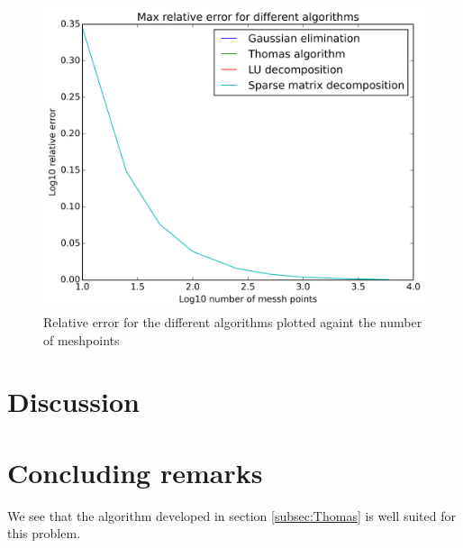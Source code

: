\documentclass[11pt,a4paper,english,draft]{article}
\numberwithin{equation}{section}
\begin{document}
\begin{figure}[ht!]
\centering
  \includegraphics[scale=0.5]{Results/n_err.png}
  \caption{Relative error for the different algorithms plotted 
  againt the number of meshpoints }
  \label{fig:err}
\end{figure}





\section{Discussion}




\section{Concluding remarks}


We see that the algorithm developed in section \ref{subsec:Thomas} is 
well suited for this problem.
\end{document}
